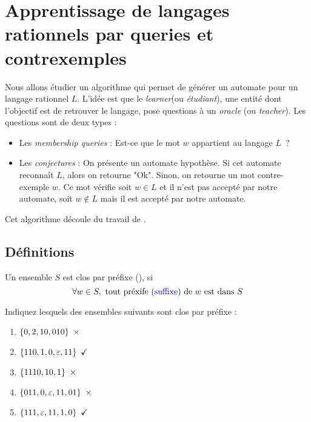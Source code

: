\section{Apprentissage de langages rationnels par queries et contrexemples}

Nous allons étudier un algorithme qui permet de générer un automate pour un langage rationnel $L$.
L'idée est que le \emph{learner}(ou \emph{étudiant}), une entité dont l'objectif est de retrouver le langage, pose
questions à un \emph{oracle} (ou \emph{teacher}). Les questions sont de deux types :

\begin{itemize}
	\item Les \emph{membership queries} : Est-ce que le mot $w$  appartient au langage $L$ ?
	\item Les \emph{conjectures} : On présente un automate hypothèse. Si cet automate reconnaît $L$, alors on retourne "Ok".
	      Sinon, on retourne un mot contre-exemple $w$. Ce mot vérifie soit $w \in L$ et il n’est pas accepté par notre
	      automate, soit $w \notin L$ mais il est accepté par notre automate.
\end{itemize}

Cet algorithme découle du travail de \cite{angluinLearning}.


\subsection{Définitions}


\begin{definition}
	Un ensemble $S$ est clos par préfixe (), si
	$$\forall w \in S, \text{ tout préxife (\textcolor{blue}{suffixe}) de $w$ est dans } S$$
\end{definition}

\begin{exercice}
	Indiquez lesquels des ensembles suivants sont clos par préfixe :
	\begin{enumerate}
		\item $\set{0,2,10,010} \ \times$
		\item $\set{110,1,0,\motvide,11} \ \checkmark$
		\item $\set{1110,10,1} \ \times$
		\item $\set{011,0,\motvide,11,01} \ \times$
		\item $\set{111,\motvide,11,1,0} \ \checkmark$
	\end{enumerate}
\end{exercice}

